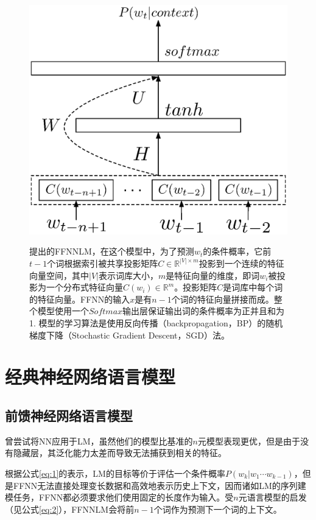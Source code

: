 \documentclass[a4paper, 12pt, twocolumn]{article}
\begin{document}
\begin{figure}[!htp]
  \centering
  \includegraphics[width=\columnwidth]{figure-1.eps}
  \label{figure:1}
  \caption{\cite{bengio2003neural}提出的FFNNLM，在这个模型中，为了预测$w_t$的条件概率，它前$t-1$个词根据索引被共享投影矩阵$C \in \mathbb{R}^{|V|\times m}$投影到一个连续的特征向量空间，其中$|V|$表示词库大小，$m$是特征向量的维度，即词$w_i$被投影为一个分布式特征向量$C(w_i)\in \mathbb{R}^m$。投影矩阵$C$是词库中每个词的特征向量。FFNN的输入$x$是有$n-1$个词的特征向量拼接而成。整个模型使用一个$Softmax$输出层保证输出词的条件概率为正并且和为1. 模型的学习算法是使用反向传播（backpropagation，BP）的随机梯度下降（Stochastic Gradient Descent，SGD）法。}
\end{figure}
\section{经典神经网络语言模型}\label{sec:classic-NNLM}
\subsection{前馈神经网络语言模型}
\cite{xu2000can}曾尝试将NN应用于LM，虽然他们的模型比基准的$n$元模型表现更优，但是由于没有隐藏层，其泛化能力太差而导致无法捕获到相关的特征。

根据公式\eqref{eq:1}的表示，LM的目标等价于评估一个条件概率$P(w_k|w_1\cdots w_{k-1})$，但是FFNN无法直接处理变长数据和高效地表示历史上下文，因而诸如LM的序列建模任务，FFNN都必须要求他们使用固定的长度作为输入。受$n$元语言模型的启发（见公式\eqref{eq:2}），FFNNLM会将前$n-1$个词作为预测下一个词的上下文。
\end{document}
